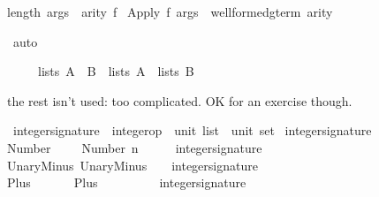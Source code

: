 \begin{isabellebody}
\begin{isamarkuptxt}
\begin{isabelle}
length\ args\ {\isacharequal}\ arity\ f{\isasymrbrakk}\isanewline
{}\ Apply\ f\ args\ {\isasymin}\ well{\isacharunderscore}formed{\isacharunderscore}gterm\ arity%
\end{isabelle}%
\end{isamarkuptxt}%
\ auto\isanewline
{}%
\begin{isamarkuptext}%
\begin{isabelle}%
\ \ \ \ \ lists\ {\isacharparenleft}A\ {\isasyminter}\ B{\isacharparenright}\ {\isacharequal}\ lists\ A\ {\isasyminter}\ lists\ B%
\end{isabelle}%
\end{isamarkuptext}%
%
\begin{isamarkuptext}%
the rest isn't used: too complicated.  OK for an exercise though.%
\end{isamarkuptext}%
\ integer{\isacharunderscore}signature\ {\isacharcolon}{\isacharcolon}\ {\isachardoublequote}{\isacharparenleft}integer{\isacharunderscore}op\ {\isacharasterisk}\ {\isacharparenleft}unit\ list\ {\isacharasterisk}\ unit{\isacharparenright}{\isacharparenright}\ set{\isachardoublequote}\isanewline
{}\ {\isachardoublequote}integer{\isacharunderscore}signature{\isachardoublequote}\isanewline
{}\isanewline
Number{\isacharcolon}\ \ \ \ \ {\isachardoublequote}{\isacharparenleft}Number\ n{\isacharcomma}\ \ \ {\isacharparenleft}{\isacharbrackleft}{\isacharbrackright}{\isacharcomma}\ {\isacharparenleft}{\isacharparenright}{\isacharparenright}{\isacharparenright}\ {\isasymin}\ integer{\isacharunderscore}signature{\isachardoublequote}\isanewline
UnaryMinus{\isacharcolon}\ {\isachardoublequote}{\isacharparenleft}UnaryMinus{\isacharcomma}\ {\isacharparenleft}{\isacharbrackleft}{\isacharparenleft}{\isacharparenright}{\isacharbrackright}{\isacharcomma}\ {\isacharparenleft}{\isacharparenright}{\isacharparenright}{\isacharparenright}\ {\isasymin}\ integer{\isacharunderscore}signature{\isachardoublequote}\isanewline
Plus{\isacharcolon}\ \ \ \ \ \ \ {\isachardoublequote}{\isacharparenleft}Plus{\isacharcomma}\ \ \ \ \ \ \ {\isacharparenleft}{\isacharbrackleft}{\isacharparenleft}{\isacharparenright}{\isacharcomma}{\isacharparenleft}{\isacharparenright}{\isacharbrackright}{\isacharcomma}\ {\isacharparenleft}{\isacharparenright}{\isacharparenright}{\isacharparenright}\ {\isasymin}\ integer{\isacharunderscore}signature{\isachardoublequote}\isanewline

\end{isabellebody}
